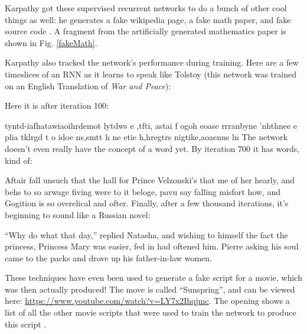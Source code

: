 Karpathy got these supervised recurrent networks to do a bunch of other cool things as well: he generates a fake wikipedia page, a fake math paper, and fake source code \cite{karpathy2015unreasonable}. A fragment from the artificially generated mathematics paper is shown in Fig. \ref{fakeMath}. 

Karpathy also tracked the network's performance during training. Here are a few timeslices of an RNN as it learns to speak like Tolstoy (this network was trained on an English Translation of \emph{War and Peace}):

\newenvironment{myquote}
  {\list{}{\leftmargin=0.3in\rightmargin=0.3in}\item[]}
  {\endlist}
  
Here it is after iteration 100:
\begin{myquote}
tyntd-iafhatawiaoihrdemot  lytdws  e ,tfti, astai f ogoh eoase rrranbyne 'nhthnee e 
plia tklrgd t o idoe ns,smtt   h ne etie h,hregtrs nigtike,aoaenns ln
\end{myquote}
The network doesn't even really have the concept of a word yet. By iteration 700 it has words, kind of:
\begin{myquote}
Aftair fall unsuch that the hall for Prince Velzonski's that me of
her hearly, and behs to so arwage fiving were to it beloge, pavu say falling misfort 
how, and Gogition is so overelical and ofter.
\end{myquote}
Finally, after a few thousand iterations, it's beginning to sound like a Russian novel:
\begin{myquote}
``Why do what that day,'' replied Natasha, and wishing to himself the fact the
princess, Princess Mary was easier, fed in had oftened him. Pierre asking his soul came to the packs and drove up his father-in-law women.
\end{myquote}

These techniques have even been used to generate a fake script for a movie, which was then actually produced!  The move is called ``Sunspring'', and can be viewed here: \url{https://www.youtube.com/watch?v=LY7x2Ihqjmc}. The opening shows a list of all the other movie scripts that were used to train the network to produce this script \cite{newitz2016movie}.

